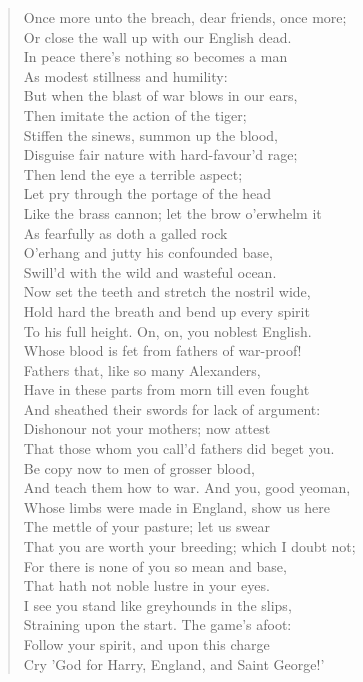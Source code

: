 \documentclass[10pt]{memoir}
\begin{document}
\begin{verse}
Once more unto the breach, dear friends, once more;\\
Or close the wall up with our English dead.\\
In peace there's nothing so becomes a man\\
As modest stillness and humility:\\
But when the blast of war blows in our ears,\\
Then imitate the action of the tiger;\\
Stiffen the sinews, summon up the blood,\\
Disguise fair nature with hard-favour'd rage;\\
Then lend the eye a terrible aspect;\\
Let pry through the portage of the head\\
Like the brass cannon; let the brow o'erwhelm it\\
As fearfully as doth a galled rock\\
O'erhang and jutty his confounded base,\\
Swill'd with the wild and wasteful ocean.\\
Now set the teeth and stretch the nostril wide,\\
Hold hard the breath and bend up every spirit\\
To his full height. On, on, you noblest English.\\
Whose blood is fet from fathers of war-proof!\\
Fathers that, like so many Alexanders,\\
Have in these parts from morn till even fought\\
And sheathed their swords for lack of argument:\\
Dishonour not your mothers; now attest\\
That those whom you call'd fathers did beget you.\\
Be copy now to men of grosser blood,\\
And teach them how to war. And you, good yeoman,\\
Whose limbs were made in England, show us here\\
The mettle of your pasture; let us swear\\
That you are worth your breeding; which I doubt not;\\
For there is none of you so mean and base,\\
That hath not noble lustre in your eyes.\\
I see you stand like greyhounds in the slips,\\
Straining upon the start. The game's afoot:\\
Follow your spirit, and upon this charge\\
Cry 'God for Harry, England, and Saint George!'
\end{verse}
\end{document}
